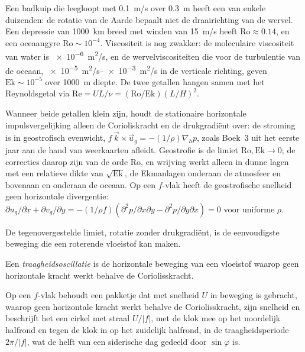 Een badkuip die leegloopt met \qty{0.1}{m/s} over \qty{0.3}{m} heeft een  van
enkele duizenden: de rotatie van de Aarde bepaalt niet de draairichting van de
wervel. Een depressie van \qty{1000}{km} breed met winden van \qty{15}{m/s} heeft
$\mathrm{Ro} \approx 0.14$, en een oceaangyre $\mathrm{Ro} \sim 10^{-4}$.
Viscositeit is nog zwakker: de moleculaire viscositeit van water is
\qty{e-6}{m^2/s}, en de wervelviscositeiten die voor de turbulentie
van de oceaan, \qtyrange{e-5}{e-3}{m^2/s} in de verticale richting, geven
$\mathrm{Ek} \sim 10^{-5}$ over \qty{1000}{m} diepte. De twee getallen hangen
samen met het Reynoldsgetal via $\mathrm{Re} = UL/\nu =
(\mathrm{Ro}/\mathrm{Ek})(L/H)^2$.

Wanneer beide getallen klein zijn, houdt de stationaire horizontale impulsvergelijking
alleen de Corioliskracht en de drukgradiënt over: de stroming is in
geostrofisch evenwicht, $f\,\vec k\times\vec u_g = -(1/\rho)\nabla_h p$, zoals
Boek~3 uit het eerste jaar aan de hand van weerkaarten afleidt. Geostrofie is de limiet
$\mathrm{Ro}, \mathrm{Ek}\to 0$; de correcties daarop zijn van de orde
$\mathrm{Ro}$, en wrijving werkt alleen in dunne lagen met een relatieve dikte van
$\sqrt{\mathrm{Ek}}$, de Ekmanlagen onderaan de atmosfeer en
bovenaan en onderaan de oceaan. Op een $f$-vlak heeft de geostrofische snelheid
geen horizontale divergentie: $\partial u_g/\partial x + \partial
v_g/\partial y = -(1/\rho f)(\partial^2 p/\partial x\partial y -
\partial^2 p/\partial y\partial x) = 0$ voor uniforme $\rho$.

De tegenovergestelde limiet, rotatie zonder drukgradiënt, is de eenvoudigste
beweging die een roterende vloeistof kan maken.

\begin{definition}[Traagheidsoscillatie]\label{def:b3:gfd-foundations:inertial}
Een \emph{traagheidsoscillatie} is de
horizontale beweging van een vloeistof waarop geen horizontale kracht werkt behalve de
Coriolisskracht.
\end{definition}

\begin{theorem}[Traagheidscirkels]\label{thm:b3:gfd-foundations:inertial}
Op een $f$-vlak behoudt een pakketje dat met snelheid $U$ in beweging is gebracht,
waarop geen horizontale kracht werkt behalve de Coriolisskracht, zijn snelheid
en beschrijft het een cirkel met straal $U/|f|$, met de klok mee op het noordelijk halfrond en
tegen de klok in op het zuidelijk halfrond, in de traagheidsperiode $2\pi/|f|$, wat de helft
van een siderische dag gedeeld door $\sin\varphi$ is.
\end{theorem}

